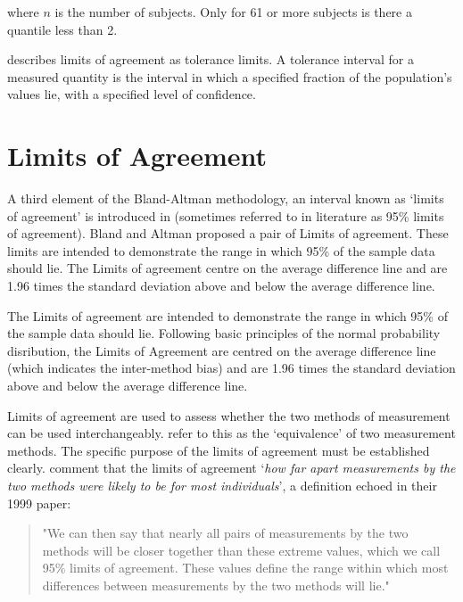 \documentclass[12pt, a4paper]{report}
\theoremstyle{plain}
\theoremstyle{definition}
\theoremstyle{remark}
\begin{document}
\noindent where $n$ is the number of subjects. Only for 61 or more
subjects is there a quantile less than 2.

\citet{luiz} describes limits of agreement as tolerance limits. A
tolerance interval for a measured quantity is the interval in
which a specified fraction of the population's values lie, with a
specified level of confidence.



\section{Limits of Agreement}
A third element of the Bland-Altman methodology, an interval known
as `limits of agreement' is introduced in \citet*{BA86}
(sometimes referred to in literature as 95\% limits of agreement). Bland and Altman proposed a pair of Limits of agreement. These
limits are intended to demonstrate the range in which 95\% of the
sample data should lie. The Limits of agreement centre on the
average difference line and are 1.96 times the standard deviation
above and below the average difference line.

The Limits of agreement are intended to demonstrate the range in which 95\% of the
sample data should lie. Following basic principles of the normal probability disribution, the Limits of Agreement are centred on the
average difference line (which indicates the inter-method bias) and are 1.96 times the standard deviation
above and below the average difference line.

Limits of agreement are used to assess whether the two methods of
measurement can be used interchangeably. \citet{BA86} refer to
this as the `equivalence' of two measurement methods. The specific purpose of the limits of
agreement must be
established clearly. \citet*{BA95} comment that the limits of agreement `\textit{how
	far apart measurements by the two methods were likely to be for
	most individuals}', a definition echoed in their 1999 paper:

\begin{quote}"We can then say that nearly all pairs
	of measurements by the two methods will be closer together than
	these extreme values, which we call 95\% limits of agreement.
	These values define the range within which most differences
	between measurements by the two methods will lie."
\end{quote}
\end{document}
